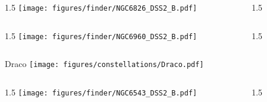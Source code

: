 \documentclass[final]{beamer}
\newlength{\colwidth}
\begin{document}

\begin{frame}[t]{}
    \begin{columns}[T]
        \begin{column}{1.5\colwidth}
            \centering
            \texttt{[image: figures/finder/NGC6826\_DSS2\_B.pdf]}
        \end{column}
        \begin{column}{1.5\colwidth}
            \Large
            
        \end{column}
    \end{columns}
    \vspace{\fill}
    \begin{columns}[T]
        \begin{column}{1.5\colwidth}
            \centering
            \texttt{[image: figures/finder/NGC6960\_DSS2\_B.pdf]}
        \end{column}
        \begin{column}{1.5\colwidth}
            \Large
            
        \end{column}
    \end{columns}
\end{frame}


\begin{frame}[t]{\LARGE Draco}
    \centering
    \texttt{[image: figures/constellations/Draco.pdf]}
\end{frame}


\begin{frame}[t]{}
    \begin{columns}[T]
        \begin{column}{1.5\colwidth}
            \centering
            \texttt{[image: figures/finder/NGC6543\_DSS2\_B.pdf]}
        \end{column}
        \begin{column}{1.5\colwidth}
            \Large
            
        \end{column}
    \end{columns}
    \vspace{\fill}
\end{frame}
\end{document}
